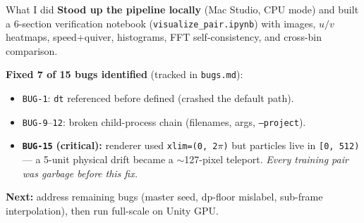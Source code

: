 \documentclass[aspectratio=169]{beamer}
\begin{document}
\begin{frame}{What I did}
\textbf{Stood up the pipeline locally} (Mac Studio, CPU mode) and built a 6-section verification notebook (\texttt{visualize\_pair.ipynb}) with images, $u/v$ heatmaps, speed+quiver, histograms, FFT self-consistency, and cross-bin comparison.

\vspace{0.5em}
\textbf{Fixed 7 of 15 bugs identified} (tracked in \texttt{bugs.md}):
\begin{itemize}\setlength\itemsep{0.15em}
  \item \texttt{BUG-1}: \texttt{dt} referenced before defined (crashed the default path).
  \item \texttt{BUG-9}--\texttt{12}: broken child-process chain (filenames, args, \texttt{--project}).
  \item \textcolor{red!70!black}{\textbf{\texttt{BUG-15}}} \textbf{(critical):} renderer used \texttt{xlim=(0,\,2$\pi$)} but particles live in \texttt{[0,\,512)} --- a 5-unit physical drift became a $\sim$127-pixel teleport. \emph{Every training pair was garbage before this fix.}
\end{itemize}

\vspace{0.4em}
\textbf{Next:} address remaining bugs (master seed, dp-floor mislabel, sub-frame interpolation), then run full-scale on Unity GPU.
\end{frame}
\end{document}
